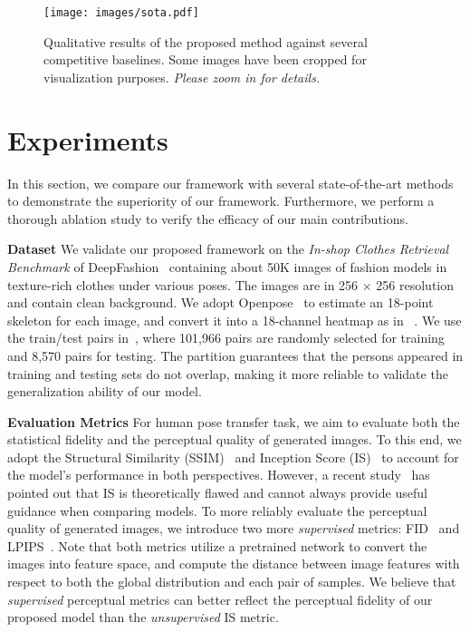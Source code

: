 \documentclass{article}
\begin{document}
\begin{figure}[t]
  \centering
  \texttt{[image: images/sota.pdf]}
  \caption{Qualitative results of the proposed method against several competitive baselines. Some images have been cropped for visualization purposes. \emph{Please zoom in for details.}}\label{fig:sota}
\end{figure}



\section{Experiments}

In this section, we compare our framework with several state-of-the-art methods to demonstrate the superiority of our framework. Furthermore, we perform a thorough ablation study to verify the efficacy of our main contributions.

    \textbf{Dataset} We validate our proposed framework on the \emph{In-shop Clothes Retrieval Benchmark} of DeepFashion~\cite{DeepFashion} containing about 50K images of fashion models in texture-rich clothes under various poses. The images are in 256 $\times$ 256 resolution and contain clean background. We adopt Openpose~\cite{Openpose} to estimate an 18-point skeleton for each image, and convert it into a 18-channel heatmap as in ~\cite{DeformableGAN}. We use the train/test pairs in~\cite{PATN}, where 101,966 pairs are randomly selected for training and 8,570 pairs for testing. The partition guarantees that the persons appeared in training and testing sets do not overlap, making it more reliable to validate the generalization ability of our model.

    \textbf{Evaluation Metrics} For human pose transfer task, we aim to evaluate both the statistical fidelity and the perceptual quality of generated images. To this end, we adopt the Structural Similarity (SSIM)~\cite{SSIM} and Inception Score (IS)~\cite{InceptionScore} to account for the model's performance in both perspectives. However, a recent study~\cite{ISnote} has pointed out that IS is theoretically flawed and cannot always provide useful guidance when comparing models. To more reliably evaluate the perceptual quality of generated images, we introduce two more \emph{supervised} metrics: FID~\cite{FID} and LPIPS~\cite{LPIPS}. Note that both metrics utilize a pretrained network to convert the images into feature space, and compute the distance between image features with respect to both the global distribution and each pair of samples. We believe that \emph{supervised} perceptual metrics can better reflect the perceptual fidelity of our proposed model than the \emph{unsupervised} IS metric.
\end{document}

